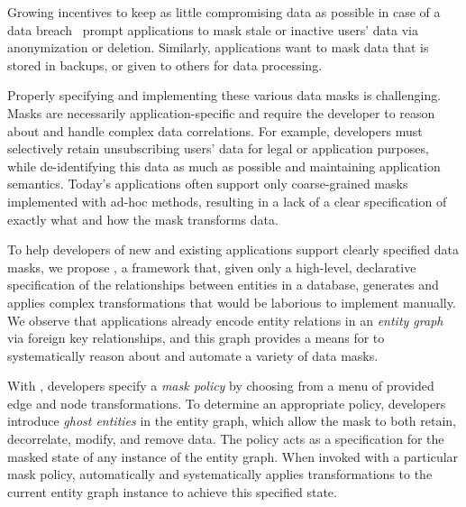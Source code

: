 Growing incentives to keep as little compromising data as possible in case of a data
breach~\cite{breach:amazon,breach:twitter, breach:fb, breach:marriott, breach:quora} prompt
applications to mask stale or inactive users' data via anonymization or deletion. Similarly,
applications want to mask data that is stored in backups, or given to others for data processing.


Properly specifying and implementing these various data masks is challenging. Masks are necessarily
application-specific and require the developer to reason about and handle complex data correlations.
For example, developers must selectively retain unsubscribing users' data for legal or application
purposes, while de-identifying this data as much as possible and maintaining application semantics.
Today's applications often support only coarse-grained masks implemented with ad-hoc methods,
resulting in a lack of a clear specification of exactly what and how the mask transforms data.

To help developers of new and existing applications support clearly specified data masks, we propose
\sys, a framework that, given only a high-level, declarative specification of the relationships
between entities in a database, generates and applies complex transformations that would be
laborious to implement manually. We observe that applications already encode entity
relations in an \emph{entity graph} via foreign key relationships, and this graph provides a means
for \sys to systematically reason about and automate a variety of data masks.

With \sys, developers specify a \emph{mask policy} by choosing from a menu of provided edge and node
transformations. To determine an appropriate policy, developers introduce \emph{ghost entities} in the entity graph, which allow the mask to both retain, decorrelate, modify,
and remove data. The policy acts as a specification for the masked state of any instance of the
entity graph. When invoked with a particular mask policy, \sys automatically and systematically
applies transformations to the current entity graph instance to achieve this specified state.

